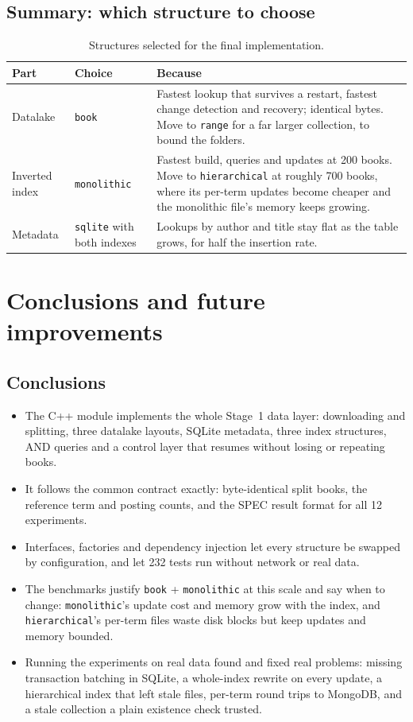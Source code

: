 \documentclass[11pt,a4paper]{article}
\newcommand{\code}[1]{\texttt{#1}}
\begin{document}
\subsection{Summary: which structure to choose}
\begin{table}[H]
\centering\small
\begin{tabularx}{\linewidth}{@{}L{2.6cm} L{3.0cm} Y@{}}
\toprule
Part & Choice & Because \\
\midrule
Datalake & \code{book} & Fastest lookup that survives a restart, fastest change detection and recovery; identical bytes. Move to \code{range} for a far larger collection, to bound the folders. \\
Inverted index & \code{monolithic} & Fastest build, queries and updates at 200 books. Move to \code{hierarchical} at roughly 700 books, where its per-term updates become cheaper and the monolithic file's memory keeps growing. \\
Metadata & \code{sqlite} with both indexes & Lookups by author and title stay flat as the table grows, for half the insertion rate. \\
\bottomrule
\end{tabularx}
\caption{Structures selected for the final implementation.}
\end{table}

\section{Conclusions and future improvements}

\subsection{Conclusions}
\begin{itemize}
  \item The C++ module implements the whole Stage~1 data layer: downloading and splitting,
        three datalake layouts, SQLite metadata, three index structures, AND queries and a control
        layer that resumes without losing or repeating books.
  \item It follows the common contract exactly: byte-identical split books, the reference term and
        posting counts, and the SPEC result format for all 12 experiments.
  \item Interfaces, factories and dependency injection let every structure be swapped by
        configuration, and let 232 tests run without network or real data.
  \item The benchmarks justify \code{book} + \code{monolithic} at this scale and say when to change:
        \code{monolithic}'s update cost and memory grow with the index, and \code{hierarchical}'s
        per-term files waste disk blocks but keep updates and memory bounded.
  \item Running the experiments on real data found and fixed real problems: missing transaction
        batching in SQLite, a whole-index rewrite on every update, a hierarchical index that left
        stale files, per-term round trips to MongoDB, and a stale collection a plain existence check
        trusted.
\end{itemize}
\end{document}
